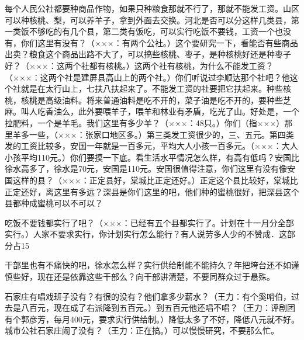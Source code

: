每个人民公社都要种商品作物，如果只种粮食那就不行了，那就不能发工资。山区可以种核桃、梨，可以养羊子，拿到外面去交换。河北是否可以分这样几类县，第一类饭不够吃的有几个县，第二类有饭吃，可以实行吃饭不要钱，工资一个也没有，你们这里有没有？（×××：有两个公社。）这个要研究一下，看能否有些商品出卖？粮食这个商品出路不大了，可以搞些核桃、枣子，是种核桃好还是种枣子好？（×××：这两个社都有核桃。）这两个社有核桃，为什么不能发工资？（×××：这两个社是建屏县高山上的两个社。）你们听说过李顺达那个社吧？他这个社就是在太行山上，七扶八扶起来了。不能发工资的社要把它扶起来。种些核桃，核桃是高级油料。将来普通油料是吃不开的，菜子油是吃不开的，要种些芝麻。叫人吃香油么，此外要喂羊子，喂羊和林业有矛盾，吃光了山。好处是，一个拉肥料，一个是羊毛。我们这里有多少羊？（×××：48只。）你们（指×××）那里羊多一些，（×××：张家口地区多。）第三类发工资很少的，三、五元。第四类发的工资比较多，安国一年就是一百多元，平均大人小孩一百多元。（×××：大人小孩平均110元。）你们要摸一下底。看生活水平情况怎么样，有高有低吗？安国比徐水高多了，徐水是70元，安国是110元。安国很值得注意，你们这里有没有像安国这样的县？（×××：正定县好，棠城比正定还好。）正定这个县比较好，棠城比正定还好，离这里有多远？深县是你们这里的吧，他们种的蜜桃很好，把深县这个县都种成蜜桃可以不可以？

吃饭不要钱都实行了吧？（×××：已经有五个县都实行了。计划在十一月分全部实行。）人家不要求实行，你计划实行怎么能行？有人说劳多人少的不赞成．这部分占15%

干部里也有不痛快的吧，徐水怎么样？实行供给制能不能持久？年把垮台还不如谨慎些好，现在还是依靠这些干部么？向干部讲清楚，不要同群众过于悬殊。

石家庄有唱戏班子没有？有很的没有？他们拿多少薪水？（王力：有个奚哨伯，过去是八百元，现在成了右派降到五百元。）到五百元他还唱不唱？（王力：评剧团有个郭彦芳，每月400元，要求实行供给制。）降低太多了不好，降低八元就不好。城市公社石家庄闹了没有？（王力：正在搞。）可以慢慢研究，不要那么忙。


